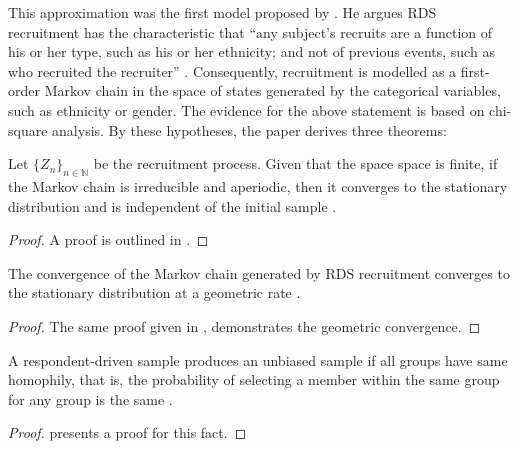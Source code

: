 This approximation was the first model proposed by \textcite{heckathorn1997}. 
He argues RDS recruitment has the characteristic that ``any subject's recruits are
a function of his or her type, such as his or her ethnicity; and not of
previous events, such as who recruited the recruiter'' \cite[p. 182]{heckathorn1997}. Consequently, 
recruitment is modelled as a first-order Markov chain in the space of states
generated by the categorical variables, such as ethnicity or gender. The
evidence for the above statement is based on chi-square analysis. By these
hypotheses, the paper derives three theorems: 

\begin{theorem} 
    Let $\{Z_n\}_{n \in \mathbb{N}}$ be the recruitment process. Given that
    the space space is finite, if the Markov chain is irreducible and
    aperiodic, then it converges to the stationary distribution and is
    independent of the initial sample \cite[p. 183]{heckathorn1997}. 
\end{theorem}

\begin{proof}
   A proof is outlined in \cite[p. 52-53]{levin2017markov}. 
\end{proof}

\begin{theorem}
    The convergence of the Markov chain generated by RDS recruitment converges
    to the stationary distribution at a geometric rate \cite[p. 186]{heckathorn1997}.
\end{theorem}

\begin{proof}
    The same proof given in \cite[p. 52-53]{levin2017markov}, demonstrates the
    geometric convergence.
\end{proof}

\begin{theorem}
  A respondent-driven sample produces an unbiased sample if all groups have
  same homophily, that is, the probability of selecting a member within the
  same group for any group is the same \cite[p. 192]{heckathorn1997}.
\end{theorem}

\begin{proof}
  \textcite[p. 191 - 192]{heckathorn1997} presents a proof for this fact. 
\end{proof}

